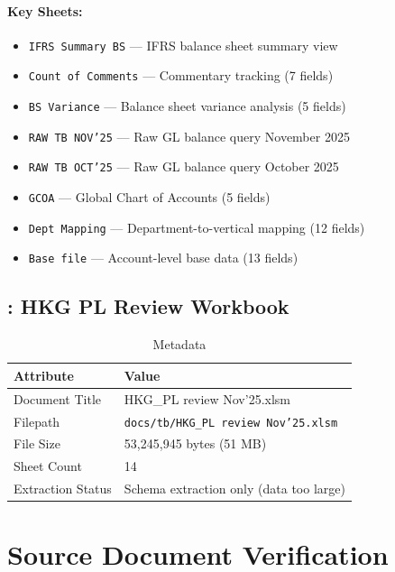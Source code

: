 \paragraph{Key Sheets:}
\begin{itemize}[noitemsep]
  \item \texttt{IFRS Summary BS} --- IFRS balance sheet summary view
  \item \texttt{Count of Comments} --- Commentary tracking (7 fields)
  \item \texttt{BS Variance} --- Balance sheet variance analysis (5 fields)
  \item \texttt{RAW TB NOV'25} --- Raw GL balance query November 2025
  \item \texttt{RAW TB OCT'25} --- Raw GL balance query October 2025
  \item \texttt{GCOA} --- Global Chart of Accounts (5 fields)
  \item \texttt{Dept Mapping} --- Department-to-vertical mapping (12 fields)
  \item \texttt{Base file} --- Account-level base data (13 fields)
\end{itemize}

\subsection{: HKG PL Review Workbook}
\label{sec:tb-wb-002}

\begin{table}[h]
\centering
\caption{ Metadata}
\begin{tabularx}{\textwidth}{@{}L{4cm}L{10cm}@{}}
\toprule
\textbf{Attribute} & \textbf{Value} \\
\midrule
Document Title & HKG\_PL review Nov'25.xlsm \\
Filepath & \texttt{docs/tb/HKG\_PL review Nov'25.xlsm} \\
File Size & 53,245,945 bytes (51 MB) \\
Sheet Count & 14 \\
Extraction Status & Schema extraction only (data too large) \\
\bottomrule
\end{tabularx}
\end{table}

\section{Source Document Verification}
\label{sec:source-verification}

